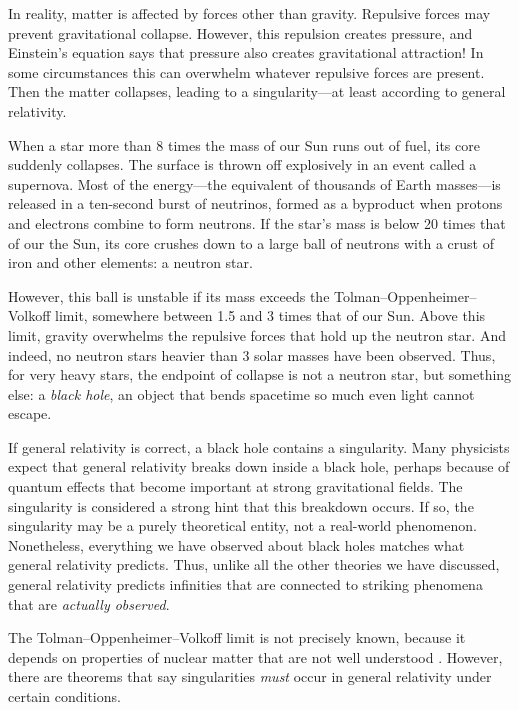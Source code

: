 \documentclass{article}
\begin{document}
In reality, matter is affected by forces other than gravity.  Repulsive forces may prevent gravitational collapse.  However, this repulsion creates pressure, and Einstein's equation says that pressure also creates gravitational attraction!   In some circumstances this can overwhelm whatever repulsive forces are present.  Then the matter collapses, leading to a singularity---at least according to general relativity.

When a star more than 8 times the mass of our Sun runs out of fuel, its core suddenly collapses.  The surface is thrown off explosively in an event called a supernova.   Most of the energy---the equivalent of thousands of Earth masses---is released in a ten-second burst of neutrinos, formed as a byproduct when protons and electrons combine to form neutrons.  If the star's mass is below 20 times that of our the Sun, its core crushes down to a large ball of neutrons with a crust of iron and other elements: a neutron star.

However, this ball is unstable if its mass exceeds the Tolman--Oppenheimer--Volkoff limit, somewhere between 1.5 and 3 times that of our Sun.   Above this limit, gravity overwhelms the repulsive forces that hold up the neutron star.  And indeed, no neutron stars heavier than 3 solar masses have been observed.   Thus, for very heavy stars, the endpoint of collapse is not a neutron star, but something else: a \emph{black hole}, an object that bends spacetime so much even light cannot escape.

If general relativity is correct, a black hole contains a singularity.  Many physicists expect that general relativity breaks down inside a black hole, perhaps because of quantum effects that become important at strong gravitational fields.  The singularity is considered a strong hint that this breakdown occurs.   If so, the singularity may be a purely theoretical entity, not a real-world phenomenon.  Nonetheless, everything we have observed about black holes matches what general relativity predicts.  Thus, unlike all the other theories we have discussed, general relativity predicts infinities that are connected to striking phenomena that are \emph{actually observed}.

The Tolman--Oppenheimer--Volkoff limit is not precisely known, because it depends on properties of nuclear matter that are not well understood \cite{Bombaci}.  However, there are theorems that say singularities \emph{must} occur in general relativity under certain conditions.  
\end{document}
